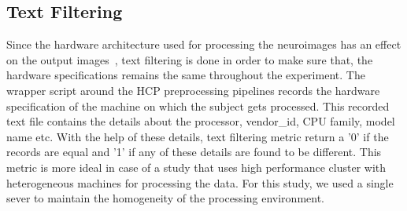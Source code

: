 \iffalse
\DontPrintSemicolon
\SetKwFunction{FMain}{Convert\_image}
\SetKwProg{Fn}{Function}{:}{}
\Fn{\FMain{$image$}}{
  \begin{algorithmic}[1]
    \IF{image extension is ``.mgz":}
      \STATE convert image to ``.nii"
    \ELSE
      \STATE do nothing
    \ENDIF
  \end{algorithmic}
\KwRet image\;
}
\hfill \break
\hfill \break
\SetKwFunction{FDice}{Get\_NRMSE}
\SetKwProg{Pn}{Function}{:}{}
\Pn{\FDice{$image\-1$,$image\-2$}}{
  \begin{algorithmic}[1]
    \STATE image\_1 $\leftarrow$ Convert\_image(image\-1);
    \STATE image\_2 $\leftarrow$ Convert\_image(image\-2);
    \STATE \textbf{fslmaths} image\_1 \text{-sub} image\_2 $\rightarrow$ diff;
    \STATE nonzero\_voxels\_image1 $\leftarrow$ get the $\textless$non-zero voxels$\textgreater$ $\textless$volume$\textgreater$ from image\_1; \COMMENT{using FSL}
    \STATE nonzero\_voxels\_image2 $\leftarrow$ get the $\textless$non-zero voxels$\textgreater$ $\textless$volume$\textgreater$ from image\_2;
    \STATE nonzero\_voxels\_difference $\leftarrow$ get the $\textless$non-zero voxels$\textgreater$ $\textless$volume$\textgreater$ from difference of images;
    \STATE \textbf{Dice\_coeff} $\leftarrow$ $\frac{(nonzero\_voxels\_image1+nonzero\_voxels\_image2)-nonzero\_voxels\_difference}{(nonzero\_voxels\_image1+nonzero\_voxels\_image2)}$;
  \end{algorithmic}
\KwRet \textbf{Dice\_coeff}\;
}
\caption*{Algorithm 2: Algorithm for finding Dice coefficient similarity from images}
\label{alg:dice_algorithm}
\fi

\subsection{Text Filtering}
Since the hardware architecture used for processing the neuroimages has an effect on the output images~\cite{10.1371/journal.pone.0038234}, text filtering is done in order to make sure that, the hardware specifications remains the same throughout the experiment. The wrapper script around the HCP preprocessing pipelines records the hardware specification of the machine on which the subject gets processed. This recorded text file contains the details about the processor, vendor\_id, CPU family, model name etc. With the help of these details, text filtering metric return a '0' if the records are equal and '1' if any of these details are found to be different. This metric is more ideal in case of a study that uses high performance cluster with heterogeneous machines for processing the data. For this study, we used a single sever to maintain the homogeneity of the processing environment.
